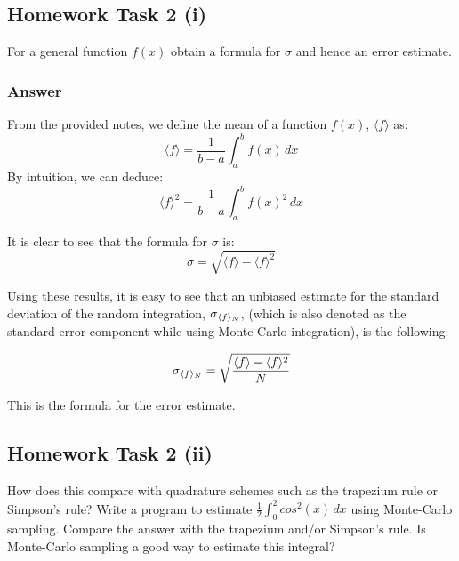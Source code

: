 \documentclass[12pt]{article}
\begin{document}
\subsection*{Homework Task 2 (i)}

For a general function $f(x)$ obtain a formula for $\sigma$ and hence an error estimate.

\subsubsection*{Answer}

From the provided notes, we define the mean of a function $f(x)$,  $\langle f\rangle$ as:
\begin{equation}
\langle f\rangle = \frac{1}{b-a}\int_{a}^{b} f(x) \,dx 
\end{equation}
By intuition, we can deduce:
\begin{equation}
\langle f\rangle ^2 = \frac{1}{b-a}\int_{a}^{b} f(x)^2 \,dx 
\end{equation}

It is clear to see that the formula for $\sigma$ is:
\begin{equation}
\sigma =  \sqrt{{\langle f\rangle} - {\langle f\rangle ^2}}
\end{equation}

Using these results, it is easy to see that an unbiased estimate for the standard deviation of the random integration, $\sigma\textsubscript{$\langle f\rangle$\textsubscript{$N$}}$, (which is also denoted as the standard error component while using Monte Carlo integration), is the following:

\begin{equation}
\sigma\textsubscript{$\langle f\rangle$\textsubscript{$N$}} = \sqrt{\frac{
\langle f\rangle - \langle f\rangle ^2 }{N}}
\end{equation}

This is the formula for the error estimate. 

\subsection*{Homework Task 2 (ii)}

How does this compare with quadrature schemes such as the trapezium rule or Simpson’s rule? Write a program to estimate $\frac{1}{2}\int_{0}^{2} cos^2(x) \,dx$ using Monte-Carlo sampling. Compare the answer with the trapezium and/or Simpson’s rule. Is Monte-Carlo sampling a good way to estimate this integral?
\end{document}

